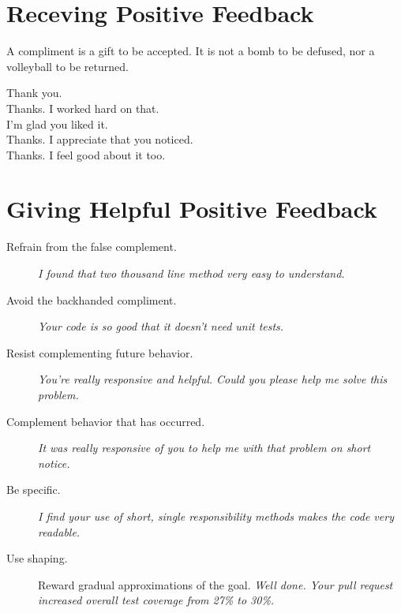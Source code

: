 \documentclass{article}
\begin{document}
\begin{multicols}{3}

	\section*{Receving Positive Feedback}

        A compliment is a gift to be accepted. It is not a bomb to be defused, nor a volleyball to be returned.

        \begin{description}
            \item[Thank you.]
            \item[Thanks. I worked hard on that.]
            \item[I'm glad you liked it.]
            \item[Thanks. I appreciate that you noticed.]
            \item[Thanks. I feel good about it too.]
        \end{description}

	\section*{Giving Helpful Positive Feedback}

        \begin{description}
            \item[Refrain from the false complement.] \emph{I found that two thousand line method very easy to understand.}
            \item[Avoid the backhanded compliment.] \emph{Your code is so good that it doesn't need unit tests.}
            \item[Resist complementing future behavior.] \emph{You're really responsive and helpful. Could you please help me solve this problem.}
            \item[Complement behavior that has occurred.] \emph{It was really responsive of you to help me with that problem on short notice.}
            \item[Be specific.] \emph{I find your use of short, single responsibility methods makes the code very readable.}
            \item[Use shaping.] Reward gradual approximations of the goal. \emph{Well done. Your pull request increased overall test coverage from 27\% to 30\%.}
        \end{description}

    \columnbreak 


\end{multicols}
\end{document}

